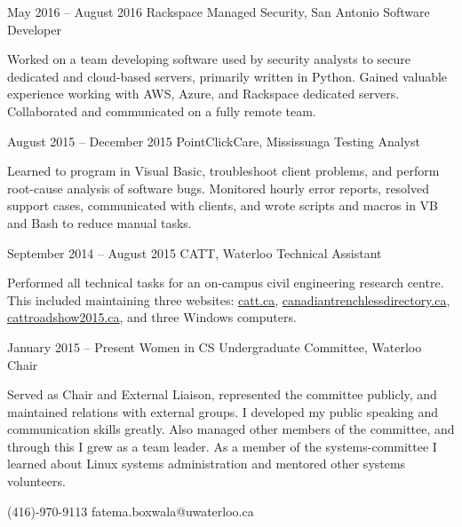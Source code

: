 \documentclass[fontsize=10pt]{tccv}
\begin{document}
\begin{eventlist}

\item{May 2016 -- August 2016}
     {Rackspace Managed Security, San Antonio}
     {Software Developer}

Worked on a team developing software used by security analysts to secure 
dedicated and cloud-based servers, primarily written in \textcolor{pank}{Python}.
Gained valuable experience working with \textcolor{pank}{AWS}, Azure, and Rackspace dedicated servers.
Collaborated and communicated on a fully remote team.

\item{August 2015 -- December 2015}
    {PointClickCare, Mississuaga}
    {Testing Analyst}
    
Learned to program in Visual Basic, troubleshoot client problems, 
and perform \textcolor{pank}{root-cause analysis} of software bugs. Monitored
hourly error reports, resolved support cases, communicated 
with clients, and wrote scripts and macros in \textcolor{pank}{VB and Bash}
to reduce manual tasks.

\item{September 2014 -- August 2015}
     {CATT, Waterloo}
     {Technical Assistant}

Performed all technical tasks for an on-campus civil engineering research
centre. This included maintaining three websites: 
\href{http://catt.ca}{catt.ca}, 
\href{http://canadiantrenchlessdirectory.ca}{canadiantrenchlessdirectory.ca}, 
\href{http://roadshow2015.cattevents.ca}{cattroadshow2015.ca}, and three
\textcolor{pank}{Windows} computers.

\item{January 2015 -- Present}
     {Women in CS Undergraduate Committee, Waterloo}
     {Chair}

Served as Chair and External Liaison, represented the committee publicly, and 
maintained relations with external groups. I developed my
\textcolor{pank}{public speaking} and communication skills greatly. 
Also \textcolor{pank}{managed} other members of the 
committee, and through this I grew as a team leader.
As a member of the systems-committee I learned about \textcolor{pank}{Linux}
systems administration and mentored other systems volunteers.

\end{eventlist}

    {(416)-970-9113}
    {fatema.boxwala@uwaterloo.ca}
\end{document}
